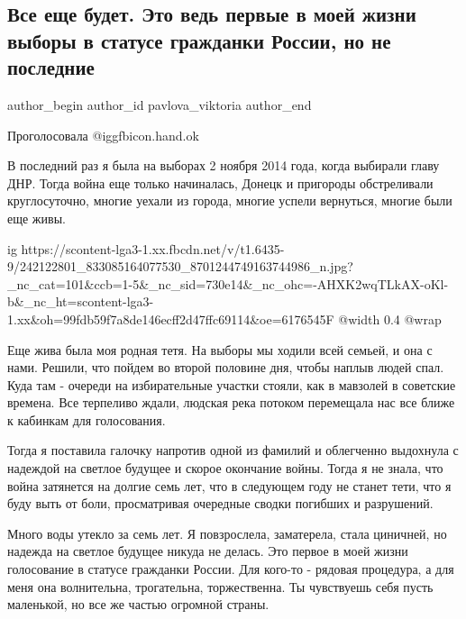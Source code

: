  
 
 
 
 
 
\subsection{Все еще будет. Это ведь первые в моей жизни выборы в статусе гражданки России, но не последние}
\label{sec:17_09_2021.fb.pavlova_viktoria.1.vybory_rossia_dnr}
 
\ifcmt
 author_begin
   author_id pavlova_viktoria
 author_end
\fi

Проголосовала @igg{fbicon.hand.ok} 

В последний раз я была на выборах 2 ноября 2014 года, когда выбирали главу ДНР.
Тогда война еще только начиналась, Донецк и пригороды обстреливали
круглосуточно, многие уехали из города, многие успели вернуться, многие были
еще живы.

\ifcmt
  ig https://scontent-lga3-1.xx.fbcdn.net/v/t1.6435-9/242122801_833085164077530_8701244749163744986_n.jpg?_nc_cat=101&ccb=1-5&_nc_sid=730e14&_nc_ohc=-AHXK2wqTLkAX-oKl-b&_nc_ht=scontent-lga3-1.xx&oh=99fdb59f7a8de146ecff2d47ffc69114&oe=6176545F
  @width 0.4
  @wrap 
\fi

Еще жива была моя родная тетя. На выборы мы ходили всей семьей, и она с нами.
Решили, что пойдем во второй половине дня, чтобы наплыв людей спал. Куда там -
очереди на избирательные участки стояли, как в мавзолей в советские времена.
Все терпеливо ждали, людская река потоком перемещала нас все ближе к кабинкам
для голосования.

Тогда я поставила галочку напротив одной из фамилий и облегченно выдохнула с
надеждой на светлое будущее и скорое окончание войны. Тогда я не знала, что
война затянется на долгие семь лет, что в следующем году не станет тети, что я
буду выть от боли, просматривая очередные сводки погибших и разрушений. 

Много воды утекло за семь лет. Я повзрослела, заматерела, стала циничней, но
надежда на светлое будущее никуда не делась. Это первое в моей жизни
голосование в статусе гражданки России. Для кого-то - рядовая процедура, а для
меня она волнительна, трогательна, торжественна. Ты чувствуешь себя пусть
маленькой, но все же частью огромной страны. 

